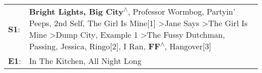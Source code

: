 \begin{supertabular}{p{0.03\textwidth}p{0.92\textwidth}}
 \textbf{S1}:  &  \textbf{Bright Lights, Big City\textsuperscript{$\wedge$}}, \enspace Professor Wormbog\textsuperscript{}, \enspace Partyin' Peeps\textsuperscript{}, \enspace 2nd Self\textsuperscript{}, \enspace The Girl Is Mine[1]\textsuperscript{} \textgreater \enspace Jane Says\textsuperscript{} \textgreater \enspace The Girl Is Mine\textsuperscript{} \textgreater \enspace Dump City\textsuperscript{}, \enspace Example 1\textsuperscript{} \textgreater \enspace The Fussy Dutchman\textsuperscript{}, \enspace Passing\textsuperscript{}, \enspace Jessica\textsuperscript{}, \enspace Ringo[2]\textsuperscript{}, \enspace I Ran\textsuperscript{}, \enspace \textbf{FF\textsuperscript{$\wedge$}}, \enspace Hangover[3]\textsuperscript{}  \enspace  \\
 \textbf{E1}:  &                                                                                                                                                                                                                                                                                                                                                                                                                                                                                                                                                                                                                                                                    In The Kitchen\textsuperscript{}, \enspace All Night Long\textsuperscript{}  \enspace  \\
\end{supertabular}
